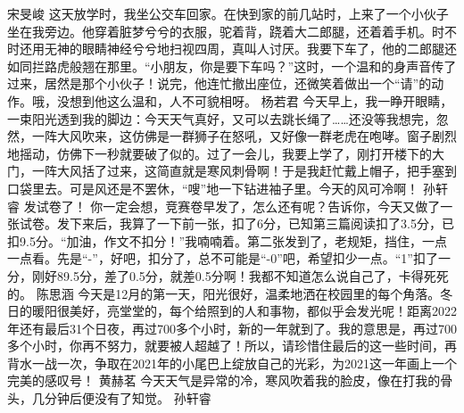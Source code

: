{}\markdownRendererInterblockSeparator
{}宋旻峻\markdownRendererInterblockSeparator
{}这天放学时，我坐公交车回家。在快到家的前几站时，上来了一个小伙子坐在我旁边。他穿着脏梦兮兮的衣服，驼着背，跷着大二郎腿，还着着手机。时不时还用无神的眼睛神经兮兮地扫视四周，真叫人讨厌。我要下车了，他的二郎腿还如同拦路虎般翘在那里。“小朋友，你是要下车吗？”这时，一个温和的身声音传了过来，居然是那个小伙子！说完，他连忙撤出座位，还微笑着做出一个“请”的动作。哦，没想到他这么温和，人不可貌相呀。\markdownRendererInterblockSeparator
{}\markdownRendererInterblockSeparator
{}杨若君\markdownRendererInterblockSeparator
{}今天早上，我一睁开眼睛，一束阳光透到我的脚边：今天天气真好，又可以去跳长绳了……还没等我想完，忽然，一阵大风吹来，这仿佛是一群狮子在怒吼，又好像一群老虎在咆哮。窗子剧烈地摇动，仿佛下一秒就要破了似的。过了一会儿，我要上学了，刚打开楼下的大门，一阵大风括了过来，这简直就是寒风刺骨啊！于是我赶忙戴上帽子，把手塞到口袋里去。可是风还是不罢休，“嗖”地一下钻进袖子里。今天的风可冷啊！ \markdownRendererInterblockSeparator
{}\markdownRendererInterblockSeparator
{}孙轩睿\markdownRendererInterblockSeparator
{}发试卷了！\markdownRendererInterblockSeparator
{}你一定会想，竞赛卷早发了，怎么还有呢？告诉你，今天又做了一张试卷。发下来后，我算了一下前一张，扣了6分，已知第三篇阅读扣了3.5分，已扣9.5分。“加油，作文不扣分！”我喃喃着。第二张发到了，老规矩，挡住，一点一点看。先是“-”，好吧，扣分了，总不可能是“-0”吧，希望扣少一点。“1”扣了一分，刚好89.5分，差了0.5分，就差0.5分啊！我都不知道怎么说自己了，卡得死死的。\markdownRendererInterblockSeparator
{}\markdownRendererInterblockSeparator
{}陈思涵\markdownRendererInterblockSeparator
{}今天是12月的第一天，阳光很好，温柔地洒在校园里的每个角落。冬日的暖阳很美好，亮堂堂的，每个给照到的人和事物，都似乎会发光呢！距离2022年还有最后31个日夜，再过700多个小时，新的一年就到了。我的意思是，再过700多个小时，你再不努力，就要被人超越了！所以，请珍惜住最后的这一些时间，再背水一战一次，争取在2021年的小尾巴上绽放自己的光彩，为2021这一年画上一个完美的感叹号！\markdownRendererInterblockSeparator
{}\markdownRendererInterblockSeparator
{}黄赫茗\markdownRendererInterblockSeparator
{}今天天气是异常的冷，寒风吹着我的脸皮，像在打我的骨头，几分钟后便没有了知觉。\markdownRendererInterblockSeparator
{}\markdownRendererInterblockSeparator
{}孙轩睿\markdownRendererInterblockSeparator
